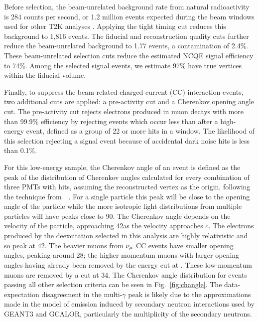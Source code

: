 \documentclass[
aps,
prd,
twocolumn,
superscriptaddress,
showpacs
]{revtex4-1}
\begin{document}
Before selection, the beam-unrelated background rate from natural radioactivity is 284 counts per second, or 1.2 million events expected during the  beam windows used for other T2K analyses \cite{Abe:2011sj}. Applying the tight timing cut reduces this background to 1,816 events.  The fiducial and reconstruction quality cuts further reduce the beam-unrelated background to 1.77 events, a contamination of 2.4\%. These beam-unrelated selection cuts reduce the estimated NCQE signal efficiency to 74\%. Among the selected signal events, we estimate 97\% have true vertices within the fiducial volume.

Finally, to suppress the beam-related charged-current (CC) interaction events, two additional cuts are applied: a pre-activity cut and a Cherenkov opening angle cut. The pre-activity cut rejects electrons produced in muon decays with more than 99.9\% efficiency by rejecting events which occur less than  after a high-energy event, defined as a group of 22 or more hits in a  window.
The likelihood of this selection rejecting a signal event because of accidental dark noise hits is less than 0.1\%. 

For this low-energy sample, the Cherenkov angle of an event is defined as the peak of the distribution of Cherenkov angles calculated for every combination of three PMTs with hits, assuming the reconstructed vertex as the origin, following the technique from~~\cite{Bays:2011si}. For a single particle this peak will be close to the opening angle of the particle while the more isotropic light distributions from multiple particles will have peaks close to 90\degr.    
The Cherenkov angle depends on the velocity of the particle, approaching 42\degr as the velocity approaches $c$. The electrons produced by the deexcitation \gmrs selected in this analysis are highly relativistic and so peak at 42\degr. The heavier muons from $\nu_\mu$ CC events have smaller opening angles, peaking around 28\degr; the higher momentum muons with larger opening angles having already been removed by the energy cut at . These low-momentum muons are removed by a cut at 34\degr. The Cherenkov angle distribution for events passing all other selection criteria can be seen in Fig.~\ref{fig:changle}. The data-expectation disagreement in the multi-$\gamma$ peak is likely due to the approximations made in the model of \gmr emission induced by secondary neutron interactions used by GEANT3 and GCALOR, particularly the multiplicity of the secondary neutrons.
\end{document}
